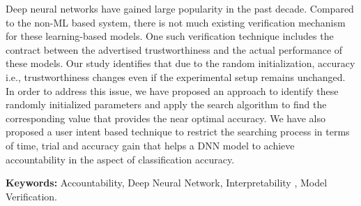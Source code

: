 Deep neural networks have gained large popularity in the past decade. Compared to the non-ML based system, there is not much existing verification mechanism for these learning-based models. One such verification technique includes the contract between the advertised trustworthiness and the actual performance of these models. Our study identifies that due to the random initialization, accuracy i.e., trustworthiness changes even if the experimental setup remains unchanged. In order to address this issue, we have proposed an approach to identify these randomly initialized parameters and apply the search algorithm to find the corresponding value that provides the near optimal accuracy.
We have also proposed a user intent based technique to restrict the searching process in terms of time, trial and accuracy gain that helps a DNN model to achieve accountability in the aspect of classification accuracy.
 

\textbf{Keywords:} Accountability, Deep Neural Network, Interpretability , Model Verification.